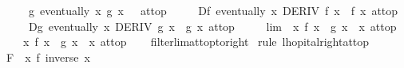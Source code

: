 \begin{isabellebody}
\ \ \ \ \ g{\isacharprime}{\kern0pt}{\isacharcolon}{\kern0pt}\ {\isachardoublequoteopen}eventually\ {\isacharparenleft}{\kern0pt}{\isasymlambda}x{\isachardot}{\kern0pt}\ g{\isacharprime}{\kern0pt}\ x\ {\isasymnoteq}\ {}{\isacharparenright}{\kern0pt}\ at{\isacharunderscore}{\kern0pt}top{\isachardoublequoteclose}\isanewline
\ \ \ \ \ Df{\isacharcolon}{\kern0pt}\ {\isachardoublequoteopen}eventually\ {\isacharparenleft}{\kern0pt}{\isasymlambda}x{\isachardot}{\kern0pt}\ DERIV\ f\ x\ {\isacharcolon}{\kern0pt}{\isachargreater}{\kern0pt}\ f{\isacharprime}{\kern0pt}\ x{\isacharparenright}{\kern0pt}\ at{\isacharunderscore}{\kern0pt}top{\isachardoublequoteclose}\isanewline
\ \ \ \ \ Dg{\isacharcolon}{\kern0pt}\ {\isachardoublequoteopen}eventually\ {\isacharparenleft}{\kern0pt}{\isasymlambda}x{\isachardot}{\kern0pt}\ DERIV\ g\ x\ {\isacharcolon}{\kern0pt}{\isachargreater}{\kern0pt}\ g{\isacharprime}{\kern0pt}\ x{\isacharparenright}{\kern0pt}\ at{\isacharunderscore}{\kern0pt}top{\isachardoublequoteclose}\isanewline
\ \ \ \ \ lim{\isacharcolon}{\kern0pt}\ {\isachardoublequoteopen}{\isacharparenleft}{\kern0pt}{\isacharparenleft}{\kern0pt}{\isasymlambda}\ x{\isachardot}{\kern0pt}\ {\isacharparenleft}{\kern0pt}f{\isacharprime}{\kern0pt}\ x\ {\isacharslash}{\kern0pt}\ g{\isacharprime}{\kern0pt}\ x{\isacharparenright}{\kern0pt}{\isacharparenright}{\kern0pt}\ {\isasymlonglongrightarrow}\ x{\isacharparenright}{\kern0pt}\ at{\isacharunderscore}{\kern0pt}top{\isachardoublequoteclose}\isanewline
\ \ \ {\isachardoublequoteopen}{\isacharparenleft}{\kern0pt}{\isacharparenleft}{\kern0pt}{\isasymlambda}\ x{\isachardot}{\kern0pt}\ f\ x\ {\isacharslash}{\kern0pt}\ g\ x{\isacharparenright}{\kern0pt}\ {\isasymlonglongrightarrow}\ x{\isacharparenright}{\kern0pt}\ at{\isacharunderscore}{\kern0pt}top{\isachardoublequoteclose}\isanewline
%
\isadelimproof
\ \ %
\endisadelimproof
%
\isatagproof
{}\isamarkupfalse%
\ filterlim{\isacharunderscore}{\kern0pt}at{\isacharunderscore}{\kern0pt}top{\isacharunderscore}{\kern0pt}to{\isacharunderscore}{\kern0pt}right\isanewline
{}\isamarkupfalse%
\ {\isacharparenleft}{\kern0pt}rule\ lhopital{\isacharunderscore}{\kern0pt}right{\isacharunderscore}{\kern0pt}{}{\isacharunderscore}{\kern0pt}at{\isacharunderscore}{\kern0pt}top{\isacharparenright}{\kern0pt}\isanewline
\ \ \isamarkupfalse%
\ {\isacharquery}{\kern0pt}F\ {\isacharequal}{\kern0pt}\ {\isachardoublequoteopen}{\isasymlambda}x{\isachardot}{\kern0pt}\ f\ {\isacharparenleft}{\kern0pt}inverse\ x{\isacharparenright}{\kern0pt}{\isachardoublequoteclose}\isanewline

\end{isabellebody}
